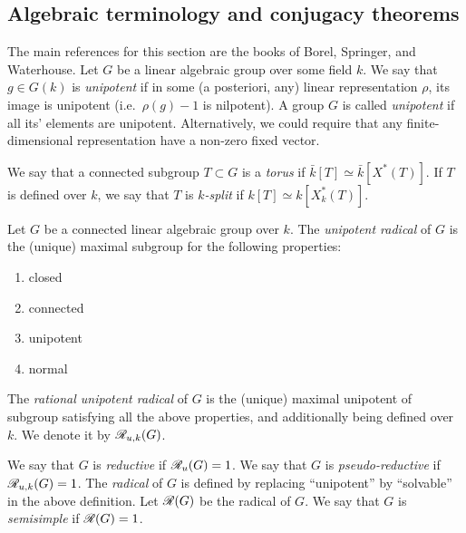 \documentclass{article}
\begin{document}
\subsection{Algebraic terminology and conjugacy theorems}

The main references for this section are the books of Borel, Springer, and 
Waterhouse. Let $G$ be a linear algebraic group over some field $k$. We say 
that $g\in G(k)$ is \emph{unipotent} if in some (a posteriori, any) 
linear representation $\rho$, its image is unipotent (i.e.\ 
$\rho(g)-1$ is nilpotent). A group $G$ is called \emph{unipotent} if all 
its' elements are unipotent. Alternatively, we could require that any 
finite-dimensional representation have a non-zero fixed vector. 

We say that a connected subgroup $T\subset G$ is a \emph{torus} if 
$\bar k[T]\simeq \bar k[X^\ast(T)]$. If $T$ is defined over $k$, we say that 
$T$ is \emph{$k$-split} if $k[T]\simeq k[X_k^\ast(T)]$. 

Let $G$ be a connected linear algebraic group over $k$. The \emph{unipotent 
radical} of $G$ is the (unique) maximal subgroup for the following properties:
\begin{enumerate}
  \item closed 
  \item connected 
  \item unipotent
  \item normal 
\end{enumerate}

The \emph{rational unipotent radical} of $G$ is the (unique) 
maximal unipotent of subgroup satisfying all the above properties, and 
additionally being defined over $k$. We denote it by 
$\mathscr{R}_{u,k}(G)$. 

We say that $G$ is \emph{reductive} if $\mathscr{R}_u(G)=1$. We say that $G$ is 
\emph{pseudo-reductive} if $\mathscr{R}_{u,k}(G) = 1$. The \emph{radical} of $G$ 
is defined by replacing ``unipotent'' by ``solvable'' in the above 
definition. Let $\mathscr{R}(G)$ be the radical of $G$. We say that $G$ is 
\emph{semisimple} if $\mathscr{R}(G)=1$. 
\end{document}
